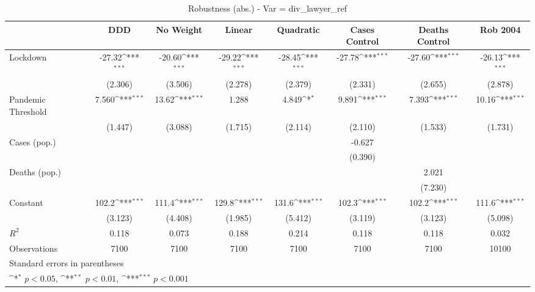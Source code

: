 \documentclass{article}
\begin{document}
{
\def\sym#1{\ifmmode^{#1}\else\(^{#1}\)\fi}
\begin{longtable}{l*{7}{c}}
\caption{Robustness (abs.) - Var = div\_lawyer\_ref}\\
\hline\hline\endfirsthead\hline\endhead\hline\endfoot\endlastfoot
                &\multicolumn{1}{c}{DDD}&\multicolumn{1}{c}{No Weight}&\multicolumn{1}{c}{Linear}&\multicolumn{1}{c}{Quadratic}&\multicolumn{1}{c}{Cases Control}&\multicolumn{1}{c}{Deaths Control}&\multicolumn{1}{c}{Rob 2004}\\
\hline
Lockdown        &   -27.32\sym{***}&   -20.60\sym{***}&   -29.22\sym{***}&   -28.45\sym{***}&   -27.78\sym{***}&   -27.60\sym{***}&   -26.13\sym{***}\\
                &  (2.306)         &  (3.506)         &  (2.278)         &  (2.379)         &  (2.331)         &  (2.655)         &  (2.878)         \\
Pandemic Threshold&    7.560\sym{***}&    13.62\sym{***}&    1.288         &    4.849\sym{*}  &    9.891\sym{***}&    7.393\sym{***}&    10.16\sym{***}\\
                &  (1.447)         &  (3.088)         &  (1.715)         &  (2.114)         &  (2.110)         &  (1.533)         &  (1.731)         \\
Cases (pop.)    &                  &                  &                  &                  &   -0.627         &                  &                  \\
                &                  &                  &                  &                  &  (0.390)         &                  &                  \\
Deaths (pop.)   &                  &                  &                  &                  &                  &    2.021         &                  \\
                &                  &                  &                  &                  &                  &  (7.230)         &                  \\
Constant        &    102.2\sym{***}&    111.4\sym{***}&    129.8\sym{***}&    131.6\sym{***}&    102.3\sym{***}&    102.2\sym{***}&    111.6\sym{***}\\
                &  (3.123)         &  (4.408)         &  (1.985)         &  (5.412)         &  (3.119)         &  (3.123)         &  (5.098)         \\
\hline
\(R^{2}\)       &    0.118         &    0.073         &    0.188         &    0.214         &    0.118         &    0.118         &    0.032         \\
Observations    &     7100         &     7100         &     7100         &     7100         &     7100         &     7100         &    10100         \\
\hline\hline
\multicolumn{8}{l}{\footnotesize Standard errors in parentheses}\\
\multicolumn{8}{l}{\footnotesize \sym{*} \(p<0.05\), \sym{**} \(p<0.01\), \sym{***} \(p<0.001\)}\\
\end{longtable}
}
\end{document}
